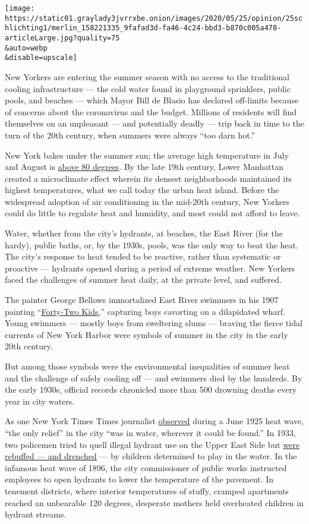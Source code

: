 \texttt{[image: https://static01.graylady3jvrrxbe.onion/images/2020/05/25/opinion/25schlichting1/merlin\_158221335\_9fafad3d-fa46-4c24-bbd3-b870c005a478-articleLarge.jpg?quality=75\\\&auto=webp\\\&disable=upscale]}

New Yorkers are entering the summer season with no access to the
traditional cooling infrastructure --- the cold water found in
playground sprinklers, public pools, and beaches --- which Mayor Bill de
Blasio has declared off-limits because of concerns about the coronavirus
and the budget. Millions of residents will find themselves on an
unpleasant --- and potentially deadly --- trip back in time to the turn
of the 20th century, when summers were always ``too darn hot.''

New York bakes under the summer sun; the average high temperature in
July and August is
\href{https://www.weather.gov/okx/CentralParkHistorical}{above 80
degrees}. By the late 19th century, Lower Manhattan created a
microclimate effect wherein its densest neighborhoods maintained its
highest temperatures, what we call today the urban heat island. Before
the widespread adoption of air conditioning in the mid-20th century, New
Yorkers could do little to regulate heat and humidity, and most could
not afford to leave.

Water, whether from the city's hydrants, at beaches, the East River (for
the hardy), public baths, or, by the 1930s, pools, was the only way to
beat the heat. The city's response to heat tended to be reactive, rather
than systematic or proactive --- hydrants opened during a period of
extreme weather. New Yorkers faced the challenges of summer heat daily,
at the private level, and suffered.

The painter George Bellows immortalized East River swimmers in his 1907
painting
``\href{https://www.nga.gov/collection/art-object-page.134485.html}{Forty-Two
Kids,}'' capturing boys cavorting on a dilapidated wharf. Young swimmers
--- mostly boys from sweltering slums --- braving the fierce tidal
currents of New York Harbor were symbols of summer in the city in the
early 20th century.

But among those symbols were the environmental inequalities of summer
heat and the challenge of safely cooling off --- and swimmers died by
the hundreds. By the early 1930s, official records chronicled more than
500 drowning deaths every year in city waters.

As one New York Times Times journalist
\href{https://timesmachine.nytimes3xbfgragh.onion/timesmachine/1925/06/07/98830729.html?pageNumber=1}{observed}
during a June 1925 heat wave, ``the only relief'' in the city ``was in
water, wherever it could be found.'' In 1933, two policemen tried to
quell illegal hydrant use on the Upper East Side but
\href{https://timesmachine.nytimes3xbfgragh.onion/timesmachine/1933/06/10/119445643.html?pageNumber=3}{were
rebuffed --- and drenched} --- by children determined to play in the
water. In the infamous heat wave of 1896, the city commissioner of
public works instructed employees to open hydrants to lower the
temperature of the pavement. In tenement districts, where interior
temperatures of stuffy, cramped apartments reached an unbearable 120
degrees, desperate mothers held overheated children in hydrant streams.

